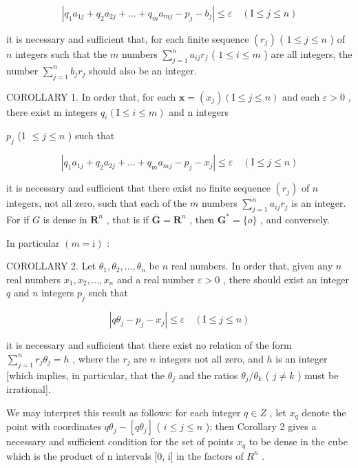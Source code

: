 \[
\left| q _ {1} a _ {1 j} + q _ {2} a _ {2 j} + \dots + q _ {m} a _ {m j} - p _ {j} - b _ {j} \right| \leqslant \varepsilon \quad (\mathrm{I} \leqslant j \leqslant n)
\]

it is necessary and sufficient that, for each finite sequence \((r_j)\) ( \(1 \leqslant j \leqslant n\) ) of \(n\) integers such that the \(m\) numbers \(\sum_{j=1}^{n} a_{ij} r_j\) ( \(1 \leqslant i \leqslant m\) ) are all integers, the number \(\sum_{j=1}^{n} b_j r_j\) should also be an integer.

COROLLARY 1. In order that, for each \(\boldsymbol{x} = (x_{j}) (\mathrm{I} \leqslant j \leqslant n)\) and each \(\varepsilon > 0\) , there exist m integers \(q_{i} (\mathrm{I} \leqslant i \leqslant m)\) and n integers

\(p_j\) (1 \(\leqslant j\leqslant n\) ) such that

\[
\left| q _ {1} a _ {1 j} + q _ {2} a _ {2 j} + \dots + q _ {m} a _ {m j} - p _ {j} - x _ {j} \right| \leqslant \varepsilon \quad (\mathrm{I} \leqslant j \leqslant n)
\]

it is necessary and sufficient that there exist no finite sequence \((r_j)\) of \(n\) integers, not all zero, such that each of the \(m\) numbers \(\sum_{j=1}^{n} a_{ij} r_j\) is an integer. For if \(G\) is dense in \(\mathbf{R}^n\) , that is if \(\overline{\mathbf{G}} = \mathbf{R}^n\) , then \(\mathbf{G}^* = \{o\}\) , and conversely.

In particular \((m = \mathrm{i})\) :

COROLLARY 2. Let \(\theta_{1},\theta_{2},\ldots ,\theta_{n}\) be \(n\) real numbers. In order that, given any \(n\) real numbers \(x_{1},x_{2},\ldots ,x_{n}\) and a real number \(\varepsilon >0\) , there should exist an integer \(q\) and \(n\) integers \(p_j\) such that

\[
\left| q \theta_ {j} - p _ {j} - x _ {j} \right| \leqslant \varepsilon \quad (\mathrm{I} \leqslant j \leqslant n)
\]

it is necessary and sufficient that there exist no relation of the form \(\sum_{j=1}^{n} r_j \theta_j = h\) , where the \(r_j\) are \(n\) integers not all zero, and \(h\) is an integer {[}which implies, in particular, that the \(\theta_j\) and the ratios \(\theta_j / \theta_k\) ( \(j \neq k\) ) must be irrational{]}.

We may interpret this result as follows: for each integer \(q \in Z\) , let \(x_{q}\) denote the point with coordinates \(q\theta_{j} - [q\theta_{j}]\) ( \(i \leqslant j \leqslant n\) ); then Corollary 2 gives a necessary and sufficient condition for the set of points \(x_{q}\) to be dense in the cube which is the product of n intervals {[}0, i{]} in the factors of \(R^{n}\) .

